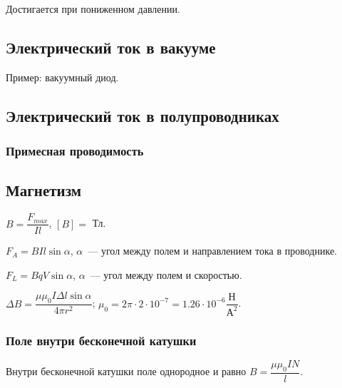\documentclass[12pt]{article}
\begin{document}
	\begin{definition}
		Достигается при пониженном давлении.
	\end{definition}
	
	\subsection{Электрический ток в вакууме}
	
	Пример: вакуумный диод.
	
	\subsection{Электрический ток в полупроводниках}
	
	\subsubsection{Примесная проводимость}
	
	\subsection{Магнетизм}
	
	\begin{definition}
		$B = \dfrac{F_{max}}{I l}$, $[B] =$ Тл.
	\end{definition}
	
	\begin{definition}
		$F_A = B I l \sin \alpha$, $\alpha$~--- угол между полем и направлением тока в проводнике.
	\end{definition}
	
	\begin{definition}
		$F_L = B q V \sin \alpha$, $\alpha$~--- угол между полем и скоростью.
	\end{definition}
	
	\begin{law}
		$\varDelta B = \dfrac{\mu \mu_0 I \varDelta l \sin \alpha}{4 \pi r^2}$; $\mu_0 = 2 \pi \cdot 2 \cdot 10^{-7} = 1.26 \cdot 10^{-6} \dfrac{\text{Н}}{\text{А}^2}$.
	\end{law}
	
	\subsubsection{Поле внутри бесконечной катушки}

	Внутри бесконечной катушки поле однородное и равно $B = \dfrac{\mu \mu_0 I N}{l}$.
	
\end{document}
